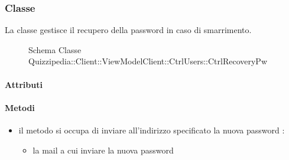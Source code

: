 \subsubsection{Classe }
La classe gestisce il recupero della password in caso di smarrimento.
\begin{figure}[H]
\centering
\noindent{}
\caption[Schema Classe CtrlRecoveryPw]{Schema Classe Quizzipedia::Client::ViewModelClient::CtrlUsers::CtrlRecoveryPw}
\end{figure}
\paragraph{Attributi}
\paragraph{Metodi}
\begin{itemize}
\item {}
\newline
il metodo si occupa di inviare all'indirizzo specificato la nuova password
\newline
{} :
\begin{itemize}
\item {}
\newline
la mail a cui inviare la nuova password
\end{itemize}
\end{itemize}
